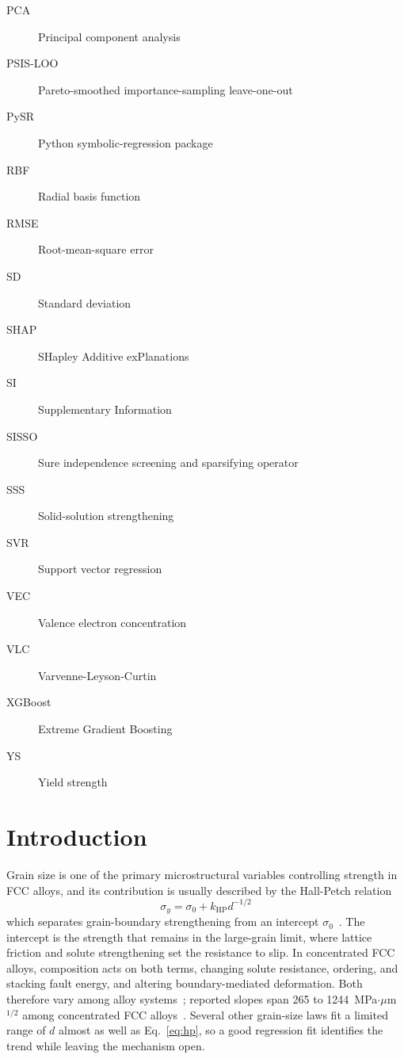 \documentclass[5p,times,twocolumn]{elsarticle}
\begin{document}
{\begin{description}
\item[PCA] Principal component analysis
\item[PSIS-LOO] Pareto-smoothed importance-sampling leave-one-out
\item[PySR] Python symbolic-regression package
\item[RBF] Radial basis function
\item[RMSE] Root-mean-square error
\item[SD] Standard deviation
\item[SHAP] SHapley Additive exPlanations
\item[SI] Supplementary Information
\item[SISSO] Sure independence screening and sparsifying operator
\item[SSS] Solid-solution strengthening
\item[SVR] Support vector regression
\item[VEC] Valence electron concentration
\item[VLC] Varvenne-Leyson-Curtin
\item[XGBoost] Extreme Gradient Boosting
\item[YS] Yield strength

\end{description}
}

\section{Introduction}
\label{sec:intro}

Grain size is one of the primary microstructural variables controlling strength in FCC alloys, and its contribution is usually described by the Hall-Petch relation
\begin{equation}
\sigma_y=\sigma_0+k_{\mathrm{HP}}d^{-1/2}
\label{eq:hp}
\end{equation}
which separates grain-boundary strengthening from an intercept $\sigma_0$~\cite{Hall1951,Petch1953,Cordero2016}. The intercept is the strength that remains in the large-grain limit, where lattice friction and solute strengthening set the resistance to slip. In concentrated FCC alloys, composition acts on both terms, changing solute resistance, ordering, and stacking fault energy, and altering boundary-mediated deformation. Both therefore vary among alloy systems~\cite{Otto2013,Yoshida2017,LiKHP2024}; reported slopes span 265 to 1244~MPa$\cdot\mu$m$^{1/2}$ among concentrated FCC alloys~\cite{Yoshida2017,Jagetia2021}. Several other grain-size laws fit a limited range of $d$ almost as well as Eq.~\eqref{eq:hp}, so a good regression fit identifies the trend while leaving the mechanism open.
\end{document}
